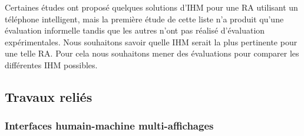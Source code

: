 Certaines études \citep{EnsFinneganIrani2014} \citep{GrubertHeinischQuigleyEtAl2015} \citep{SerranoEnsYangEtAl2015} \citep{SerranoEnsYangEtAl2015b} ont proposé quelques solutions d'IHM pour une RA utilisant un téléphone intelligent, mais la première étude de cette liste n'a produit qu'une évaluation informelle tandis que les autres n'ont pas réalisé d'évaluation expérimentales. Nous souhaitons savoir quelle IHM serait la plus pertinente pour une telle RA. Pour cela nous souhaitons mener des évaluations pour comparer les différentes IHM possibles.


\subsection{Travaux reliés}
\subsubsection{Interfaces humain-machine multi-affichages}
